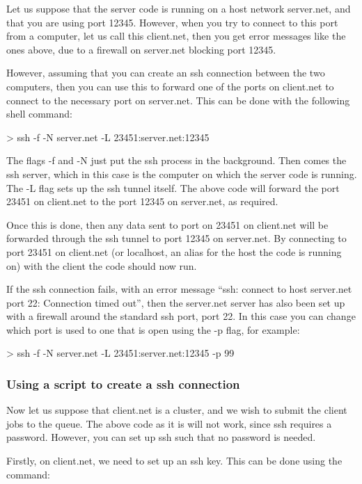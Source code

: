 \documentclass[11pt,english,fleqn]{report}
\newenvironment{code}{%
\footnotesize 
\verbatim
}{
\endverbatim
\normalsize
}
\begin{document}
Let us suppose that the server code is running on a host network server.net,
and that you are using port 12345. However, when you try to connect
to this port from a computer, let us call this client.net, then you
get error messages like the ones above, due to a firewall on server.net
blocking port 12345.

However, assuming that you can create an ssh connection between the
two computers, then you can use this to forward one of the ports on
client.net to connect to the necessary port on server.net. This can
be done with the following shell command:

\begin{code}
> ssh -f -N server.net -L 23451:server.net:12345
\end{code}

The flags -f and -N just put the ssh process in the background. Then
comes the ssh server, which in this case is the computer on which
the server code is running. The -L flag sets up the ssh tunnel itself.
The above code will forward the port 23451 on client.net to the port
12345 on server.net, as required.

Once this is done, then any data sent to port on 23451 on client.net
will be forwarded through the ssh tunnel to port 12345 on server.net.
By connecting to port 23451 on client.net (or localhost, an alias
for the host the code is running on) with the client the code should
now run.

If the ssh connection fails, with an error message {}``ssh: connect
to host server.net port 22: Connection timed out'', then the server.net
server has also been set up with a firewall around the standard ssh
port, port 22. In this case you can change which port is used to one
that is open using the -p flag, for example:

\begin{code}
> ssh -f -N server.net -L 23451:server.net:12345 -p 99
\end{code}


\subsubsection{Using a script to create a ssh connection}

Now let us suppose that client.net is a cluster, and we wish to submit
the client jobs to the queue. The above code as it is will not work,
since ssh requires a password. However, you can set up ssh such that
no password is needed. 

Firstly, on client.net, we need to set up an ssh key. This can be
done using the command:
\end{document}
